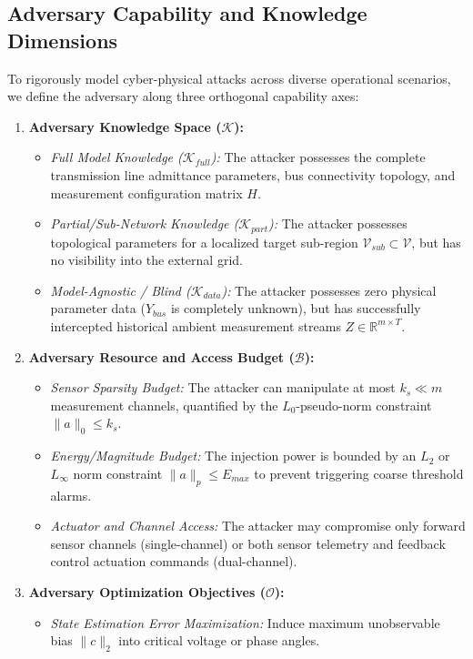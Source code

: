 \documentclass[journal,compsoc]{IEEEtran}
\begin{document}
\subsection{Adversary Capability and Knowledge Dimensions}
To rigorously model cyber-physical attacks across diverse operational scenarios, we define the adversary along three orthogonal capability axes:
\begin{enumerate}
    \item \textbf{Adversary Knowledge Space ($\mathcal{K}$):}
    \begin{itemize}
        \item \textit{Full Model Knowledge ($\mathcal{K}_{full}$):} The attacker possesses the complete transmission line admittance parameters, bus connectivity topology, and measurement configuration matrix $H$.
        \item \textit{Partial/Sub-Network Knowledge ($\mathcal{K}_{part}$):} The attacker possesses topological parameters for a localized target sub-region $\mathcal{V}_{sub} \subset \mathcal{V}$, but has no visibility into the external grid.
        \item \textit{Model-Agnostic / Blind ($\mathcal{K}_{data}$):} The attacker possesses zero physical parameter data ($Y_{bus}$ is completely unknown), but has successfully intercepted historical ambient measurement streams $Z \in \mathbb{R}^{m \times T}$.
    \end{itemize}
    \item \textbf{Adversary Resource and Access Budget ($\mathcal{B}$):}
    \begin{itemize}
        \item \textit{Sensor Sparsity Budget:} The attacker can manipulate at most $k_s \ll m$ measurement channels, quantified by the $L_0$-pseudo-norm constraint $\|a\|_0 \le k_s$.
        \item \textit{Energy/Magnitude Budget:} The injection power is bounded by an $L_2$ or $L_\infty$ norm constraint $\|a\|_p \le E_{max}$ to prevent triggering coarse threshold alarms.
        \item \textit{Actuator and Channel Access:} The attacker may compromise only forward sensor channels (single-channel) or both sensor telemetry and feedback control actuation commands (dual-channel).
    \end{itemize}
    \item \textbf{Adversary Optimization Objectives ($\mathcal{O}$):}
    \begin{itemize}
        \item \textit{State Estimation Error Maximization:} Induce maximum unobservable bias $\|c\|_2$ into critical voltage or phase angles.

\end{itemize}
\end{enumerate}
\end{document}

